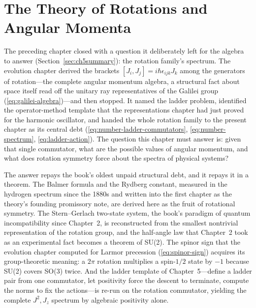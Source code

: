 ﻿\chapter{The Theory of Rotations and Angular Momenta}

The preceding chapter closed with a question it deliberately left for the algebra to answer (Section~\ref{sec:ch5summary}): the rotation family's spectrum. The evolution chapter derived the brackets $[J_i,J_j]=i\hbar\epsilon_{ijk}J_k$ among the generators of rotation---the complete angular momentum algebra, a structural fact about space itself read off the unitary ray representatives of the Galilei group (\eqref{eq:galilei-algebra})---and then stopped. It named the ladder problem, identified the operator-method template that the representations chapter had just proved for the harmonic oscillator, and handed the whole rotation family to the present chapter as its central debt (\eqref{eq:number-ladder-commutators}, \eqref{eq:number-spectrum}, \eqref{eq:ladder-action}). The question this chapter must answer is: given that single commutator, what are the possible values of angular momentum, and what does rotation symmetry force about the spectra of physical systems?

The answer repays the book's oldest unpaid structural debt, and it repays it in a theorem. The Balmer formula and the Rydberg constant, measured in the hydrogen spectrum since the 1880s and written into the first chapter as the theory's founding promissory note, are derived here as the fruit of rotational symmetry. The Stern--Gerlach two-state system, the book's paradigm of quantum incompatibility since Chapter~2, is reconstructed from the smallest nontrivial representation of the rotation group, and the half-angle law that Chapter~2 took as an experimental fact becomes a theorem of SU(2). The spinor sign that the evolution chapter computed for Larmor precession (\eqref{eq:spinor-sign}) acquires its group-theoretic meaning: a $2\pi$ rotation multiplies a spin-$1/2$ state by $-1$ because SU(2) covers SO(3) twice. And the ladder template of Chapter~5---define a ladder pair from one commutator, let positivity force the descent to terminate, compute the norms to fix the actions---is re-run on the rotation commutator, yielding the complete $J^2,J_z$ spectrum by algebraic positivity alone.


